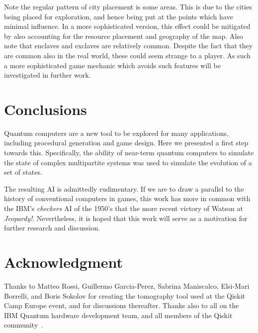 \documentclass[conference]{IEEEtran}
\begin{document}
Note the regular pattern of city placement is some areas. This is due to the cities being placed for exploration, and hence being put at the points which have minimal influence. In a more sophisticated version, this effect could be mitigated by also accounting for the resource placement and geography of the map. Also note that enclaves and exclaves are relatively common. Despite the fact that they are common also in the real world, these could seem strange to a player. As such a more sophisticated game mechanic which avoids such features will be investigated in further work.

\section{Conclusions}

Quantum computers are a new tool to be explored for many applications, including procedural generation and game design. Here we presented a first step towards this. Specifically, the ability of near-term quantum computers to simulate the state of complex multipartite systems was used to simulate the evolution of a set of states.

The resulting AI is admittedly rudimentary. If we are to draw a parallel to the history of conventional computers in games, this work has more in common with the IBM's \textit{checkers} AI of the 1950's that the more recent victory of Watson at \textit{Jeopardy!}. Nevertheless, it is hoped that this work will serve as a motivation for further research and discussion.

\section*{Acknowledgment}

Thanks to Matteo Rossi, Guillermo Garcia-Perez, Sabrina Maniscalco, Elsi-Mari Borrelli, and Boris Sokolov for creating the tomography tool used at the Qiskit Camp Europe event, and for discussions thereafter. Thanks also to all on the IBM Quantum hardware development team, and all members of the Qiskit community~\cite{qiskit}.



\end{document}
